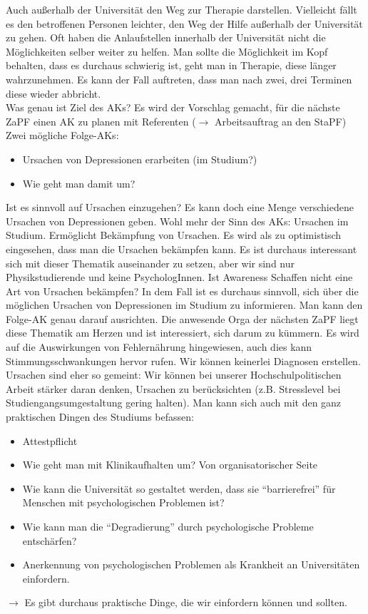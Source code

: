     Auch außerhalb der Universität den Weg zur Therapie darstellen. Vielleicht fällt es den betroffenen Personen leichter, den Weg der Hilfe außerhalb der Universität zu gehen.
    Oft haben die Anlaufstellen innerhalb der Universität nicht die Möglichkeiten selber weiter zu helfen.
    Man sollte die Möglichkeit im Kopf behalten, dass es durchaus schwierig ist, geht man in Therapie, diese länger wahrzunehmen. Es kann der Fall auftreten, dass man nach zwei, drei Terminen diese wieder abbricht. \\
    Was genau ist Ziel des AKs?
    Es wird der Vorschlag gemacht, für die nächste ZaPF einen AK zu planen mit Referenten ($\rightarrow$ Arbeitsauftrag an den StaPF) \\
    Zwei mögliche Folge-AKs: \\
    \begin{itemize}
      \item Ursachen von Depressionen erarbeiten (im Studium?)
      \item Wie geht man damit um?
    \end{itemize}

    Ist es sinnvoll auf Ursachen einzugehen? Es kann doch eine Menge verschiedene Ursachen von Depressionen geben.
    Wohl mehr der Sinn des AKs: Ursachen im Studium.
    Ermöglicht Bekämpfung von Ursachen.
    Es wird als zu optimistisch eingesehen, dass man die Ursachen bekämpfen kann. Es ist durchaus interessant sich mit dieser Thematik auseinander zu setzen, aber wir sind nur Physikstudierende und keine PsychologInnen.
    Ist Awareness Schaffen nicht eine Art von Ursachen bekämpfen? In dem Fall ist es durchaus sinnvoll, sich über die möglichen Ursachen von Depressionen im Studium zu informieren.
    Man kann den Folge-AK genau darauf ausrichten. Die anwesende Orga der nächsten ZaPF liegt diese Thematik am Herzen und ist interessiert, sich darum zu kümmern.
    Es wird auf die Auswirkungen von Fehlernährung hingewiesen, auch dies kann Stimmungsschwankungen hervor rufen.
    Wir können keinerlei Diagnosen erstellen.
    Ursachen sind eher so gemeint: Wir können bei unserer Hochschulpolitischen Arbeit stärker daran denken, Ursachen zu berücksichten (z.B. Stresslevel bei Studiengangsumgestaltung gering halten).
    Man kann sich auch mit den ganz praktischen Dingen des Studiums befassen:
    \begin{itemize}
      \item Attestpflicht
      \item Wie geht man mit Klinikaufhalten um? Von organisatorischer Seite
      \item Wie kann die Universität so gestaltet werden, dass sie ``barrierefrei'' für Menschen mit psychologischen Problemen ist?
      \item Wie kann man die ``Degradierung'' durch psychologische Probleme entschärfen?
      \item Anerkennung von psychologischen Problemen als Krankheit an Universitäten einfordern.
    \end{itemize}
    $\rightarrow$ Es gibt durchaus praktische Dinge, die wir einfordern können und sollten. \\

